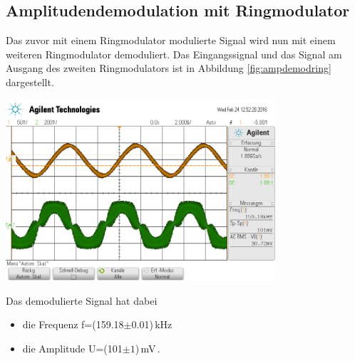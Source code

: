 \documentclass[]{scrartcl}
\begin{document}
\subsection{Amplitudendemodulation mit Ringmodulator}
Das zuvor mit einem Ringmodulator modulierte Signal wird nun mit einem weiteren Ringmodulator demoduliert. Das Eingangssignal und das Signal am Ausgang des zweiten Ringmodulators ist in Abbildung \ref{fig:ampdemodring} dargestellt.
\begin{center}
	\includegraphics[width=10cm]{images/ampdemodring.png}
	\label{fig:ampdemodring}
\end{center}
Das demodulierte Signal hat dabei 
\begin{itemize}
	\item die Frequenz f=(159.18$\pm$0.01)\,kHz
	\item die Amplitude U=(101$\pm1$)\,mV\,.
\end{itemize}
\end{document}
